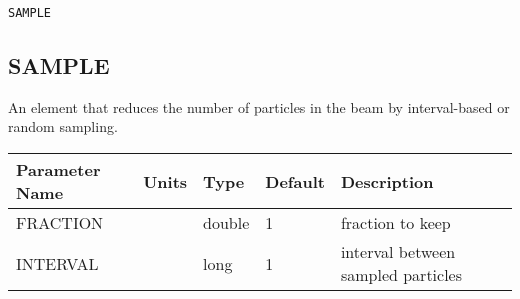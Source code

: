 \begin{latexonly}
\newpage
\begin{center}{\Large\verb|SAMPLE|}\end{center}
\end{latexonly}\subsection{SAMPLE}
An element that reduces the number of particles in the beam by interval-based or
random sampling.
\\
\begin{tabular}{|l|l|l|l|p{\descwidth}|} \hline
Parameter Name & Units & Type & Default & Description \\ \hline 
FRACTION &  & double &   1 & fraction to keep  \\ \hline 
INTERVAL &  & long &   1               & interval between sampled particles  \\ \hline 
\end{tabular}

